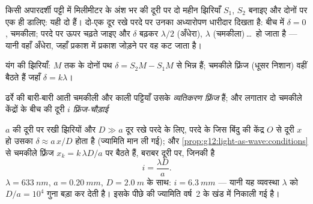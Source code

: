 \begin{example}[यंग का दो-झिरी वाला प्रयोग]\label{ex:g12:light-as-wave:young}
किसी अपारदर्शी पट्टी में मिलीमीटर के अंश भर की दूरी पर दो महीन झिरियाँ
$S_1$, $S_2$ बनाइए और दोनों पर एक ही  डालिए: यही दो
 हैं। दो-एक  दूर रखे परदे पर उनका
अध्यारोपण धारीदार दिखता है: बीच में $\delta = 0$, चमकीला; परदे पर ऊपर चढ़ते जाइए
और $\delta$ बढ़कर $\lambda/2$ (अँधेरा), $\lambda$ (चमकीला)\,\dots\ हो जाता है ---
यानी वहाँ अँधेरा, जहाँ प्रकाश में प्रकाश जोड़ने पर वह कट जाता है।
\end{example}

\begin{omfigure}

{\small यंग की झिरियाँ: $M$ तक के दोनों पथ $\delta = S_2M -
S_1M$ से भिन्न हैं; चमकीले
फ़्रिंज (धूसर निशान) वहीं बैठते हैं जहाँ $\delta = k\lambda$।}
\end{omfigure}

\begin{definition}[फ़्रिंज और फ़्रिंज-चौड़ाई]\label{def:g12:light-as-wave:fringes}
ढर्रे की बारी-बारी आती चमकीली और काली पट्टियाँ उसके \emph{व्यतिकरण
फ़्रिंज} हैं; और लगातार दो चमकीले केंद्रों के बीच की
दूरी $i$ \emph{फ़्रिंज-चौड़ाई}%
\end{definition}

\begin{proposition}[फ़्रिंज-चौड़ाई]\label{prop:g12:light-as-wave:interfringe}
$a$ की दूरी पर रखी झिरियों और $D \gg a$ दूर रखे परदे के लिए, परदे के जिस
बिंदु की केंद्र $O$ से दूरी $x$ हो उसका  $\delta \approx a\,x/D$ होता
है (ज्यामिति मान ली गई); और \cref{prop:g12:light-as-wave:conditions} से चमकीले फ़्रिंज $x_k = k\,\lambda D/a$ पर बैठते हैं,
बराबर दूरी पर, जिनकी  है
\[
i = \frac{\lambda D}{a}.
\]
$\lambda = \qty{633}{nm}$, $a = \qty{0.20}{mm}$, $D =
\qty{2.0}{m}$ के साथ: $i = \qty{6.3}{mm}$ --- यानी यह व्यवस्था $\lambda$ को
$D/a = 10^4$ गुना बड़ा कर देती है। इसके पीछे की ज्यामिति वर्ष~2 के खंड में निकाली
गई है।
\end{proposition}
\admitted

